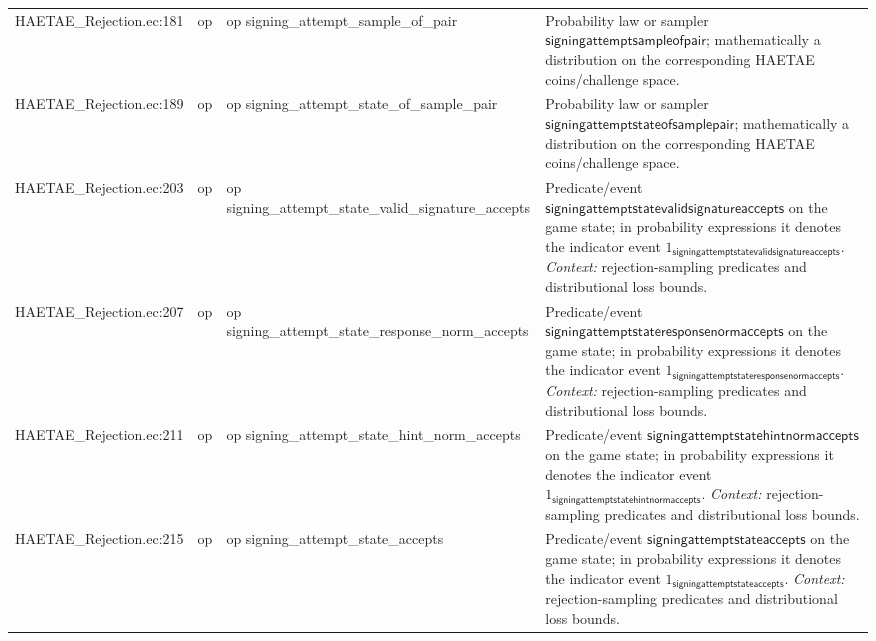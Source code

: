 \documentclass[10pt]{article}
\begin{document}
\begin{longtable}{L{0.11\textwidth}L{0.055\textwidth}L{0.385\textwidth}L{0.41\textwidth}}
HAETAE\_\allowbreak{}Rejection.\allowbreak{}ec:\allowbreak{}181 & op & {\ttfamily\scriptsize op signing\_\allowbreak{}attempt\_\allowbreak{}sample\_\allowbreak{}of\_\allowbreak{}pair} & Probability law or sampler $\mathsf{signingattemptsampleofpair}$; mathematically a distribution on the corresponding HAETAE coins/challenge space. \\
HAETAE\_\allowbreak{}Rejection.\allowbreak{}ec:\allowbreak{}189 & op & {\ttfamily\scriptsize op signing\_\allowbreak{}attempt\_\allowbreak{}state\_\allowbreak{}of\_\allowbreak{}sample\_\allowbreak{}pair} & Probability law or sampler $\mathsf{signingattemptstateofsamplepair}$; mathematically a distribution on the corresponding HAETAE coins/challenge space. \\
HAETAE\_\allowbreak{}Rejection.\allowbreak{}ec:\allowbreak{}203 & op & {\ttfamily\scriptsize op signing\_\allowbreak{}attempt\_\allowbreak{}state\_\allowbreak{}valid\_\allowbreak{}signature\_\allowbreak{}accepts} & Predicate/event $\mathsf{signingattemptstatevalidsignatureaccepts}$ on the game state; in probability expressions it denotes the indicator event $1_{\mathsf{signingattemptstatevalidsignatureaccepts}}$. \emph{Context:} rejection-sampling predicates and distributional loss bounds. \\
HAETAE\_\allowbreak{}Rejection.\allowbreak{}ec:\allowbreak{}207 & op & {\ttfamily\scriptsize op signing\_\allowbreak{}attempt\_\allowbreak{}state\_\allowbreak{}response\_\allowbreak{}norm\_\allowbreak{}accepts} & Predicate/event $\mathsf{signingattemptstateresponsenormaccepts}$ on the game state; in probability expressions it denotes the indicator event $1_{\mathsf{signingattemptstateresponsenormaccepts}}$. \emph{Context:} rejection-sampling predicates and distributional loss bounds. \\
HAETAE\_\allowbreak{}Rejection.\allowbreak{}ec:\allowbreak{}211 & op & {\ttfamily\scriptsize op signing\_\allowbreak{}attempt\_\allowbreak{}state\_\allowbreak{}hint\_\allowbreak{}norm\_\allowbreak{}accepts} & Predicate/event $\mathsf{signingattemptstatehintnormaccepts}$ on the game state; in probability expressions it denotes the indicator event $1_{\mathsf{signingattemptstatehintnormaccepts}}$. \emph{Context:} rejection-sampling predicates and distributional loss bounds. \\
HAETAE\_\allowbreak{}Rejection.\allowbreak{}ec:\allowbreak{}215 & op & {\ttfamily\scriptsize op signing\_\allowbreak{}attempt\_\allowbreak{}state\_\allowbreak{}accepts} & Predicate/event $\mathsf{signingattemptstateaccepts}$ on the game state; in probability expressions it denotes the indicator event $1_{\mathsf{signingattemptstateaccepts}}$. \emph{Context:} rejection-sampling predicates and distributional loss bounds. \\

\end{longtable}
\end{document}
